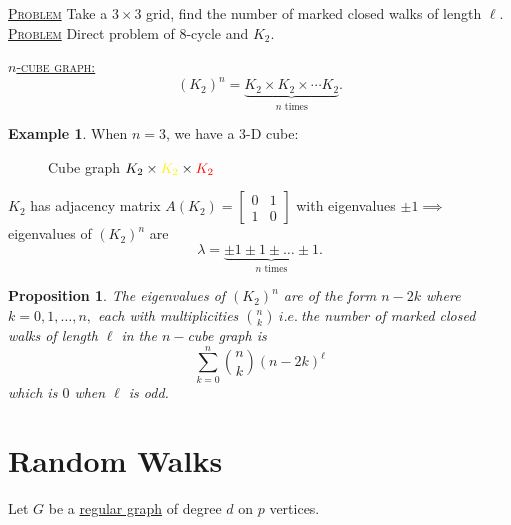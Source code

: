 \documentclass{report}
\newcommand{\ie}{\ i.e.\ }
\newcommand{\fancyem}[1]{\underline{\textsc{#1}}}
\newtheorem{proposition}{Proposition}[section]
\theoremstyle{definition}
\newtheorem{example}{Example}[section]
\theoremstyle{remark}
\numberwithin{equation}{section}
\begin{document}
\fancyem{Problem}
Take a $3 \times 3$ grid, find the number of marked closed walks of length $\ell.$\\
\fancyem{Problem}
Direct problem of $8$-cycle and $K_2.$



\fancyem{$n$-cube graph:}
\[(K_2)^n = \underbrace{K_2 \times K_2 \times \cdots K_2}_\text{$n$ times}.\]

\begin{example}
When $n = 3$, we have a $3$-D cube:
\begin{figure}[h]
\centering
{}
\label{fig:cube}
\caption{Cube graph $K_2 \times \color{yellow} K_2 \color{black} \times \color{red} K_2$ }
\end{figure}
\end{example}

$K_2$ has adjacency matrix $A(K_2) = \begin{bmatrix}
0 & 1 \\ 1 & 0
\end{bmatrix}$ with eigenvalues $\pm 1 \implies$ eigenvalues of $(K_2)^n$ are
\[
\lambda = \underbrace{\pm 1 \pm 1 \pm \ldots \pm 1}_\text{$n$ times}.
\]

\begin{proposition}
The eigenvalues of $(K_2)^n$ are of the form $n - 2k$ where $k = 0, 1, \ldots, n,$ each with multiplicities ${n \choose k} \ie$the number of marked closed walks of length $\ell$ in the $n-$cube graph is
\[\sum_{k = 0}^n {n \choose k} (n - 2k)^\ell\]
which is $0$ when $\ell$ is odd.
\end{proposition}

\section{Random Walks}
Let $G$ be a \underline{regular graph} of degree $d$ on $p$ vertices.
\end{document}
